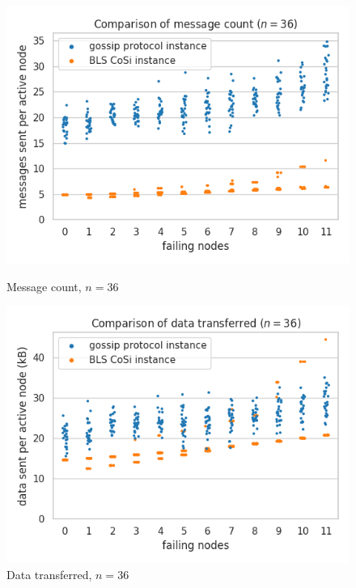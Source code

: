 \begin{figure}[H]
    \centering
    \begin{minipage}{0.5\textwidth}
        \centering
        \includegraphics[width=\textwidth]{figures/1/bandwidth_msg_tx_sum_36.png}
        \captionsetup{labelformat=empty}
        \caption{Message count, $n = 36$}
    \end{minipage}\hfill
    \begin{minipage}{0.5\textwidth}
        \centering
        \includegraphics[width=\textwidth]{figures/1/bandwidth_tx_sum_36.png}
        \captionsetup{labelformat=empty}
        \caption{Data transferred, $n = 36$}
    \end{minipage}\hfill
\end{figure}

